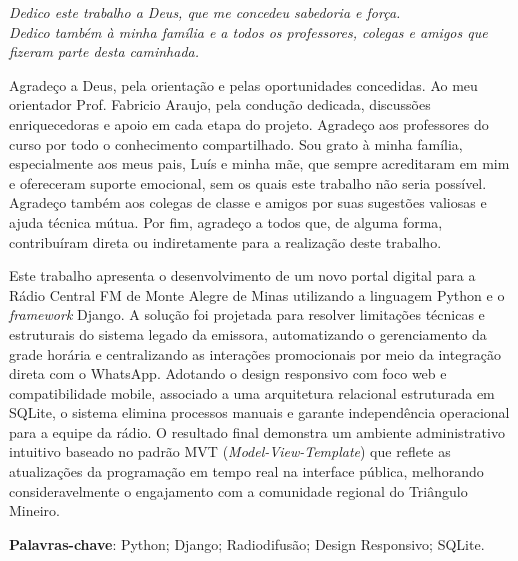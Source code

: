 \documentclass[12pt, openright, oneside, a4paper, brazil]{ads-unipac-abntex2}
\begin{document}
 
\frenchspacing 

\imprimircapa
\imprimirfolhaderosto

\begin{dedicatoria}
  \vspace*{\fill}
  \centering
  \noindent
  \textit{Dedico este trabalho a Deus, que me concedeu sabedoria e força. \\
  Dedico também à minha família e a todos os professores, colegas e amigos que fizeram parte desta caminhada.}
  \vspace*{\fill}
\end{dedicatoria}

\begin{agradecimentos}
\noindent
Agradeço a Deus, pela orientação e pelas oportunidades concedidas. Ao meu orientador Prof. Fabricio Araujo, pela condução dedicada, discussões enriquecedoras e apoio em cada etapa do projeto. Agradeço aos professores do curso por todo o conhecimento compartilhado. Sou grato à minha família, especialmente aos meus pais, Luís e minha mãe, que sempre acreditaram em mim e ofereceram suporte emocional, sem os quais este trabalho não seria possível. Agradeço também aos colegas de classe e amigos por suas sugestões valiosas e ajuda técnica mútua. Por fim, agradeço a todos que, de alguma forma, contribuíram direta ou indiretamente para a realização deste trabalho.
\end{agradecimentos}

\begin{resumo}
Este trabalho apresenta o desenvolvimento de um novo portal digital para a Rádio Central FM de Monte Alegre de Minas utilizando a linguagem Python e o \textit{framework} Django. A solução foi projetada para resolver limitações técnicas e estruturais do sistema legado da emissora, automatizando o gerenciamento da grade horária e centralizando as interações promocionais por meio da integração direta com o WhatsApp. Adotando o design responsivo com foco web e compatibilidade mobile, associado a uma arquitetura relacional estruturada em SQLite, o sistema elimina processos manuais e garante independência operacional para a equipe da rádio. O resultado final demonstra um ambiente administrativo intuitivo baseado no padrão MVT (\textit{Model-View-Template}) que reflete as atualizações da programação em tempo real na interface pública, melhorando consideravelmente o engajamento com a comunidade regional do Triângulo Mineiro.

\vspace{\onelineskip}
    
 \noindent
 \textbf{Palavras-chave}: Python; Django; Radiodifusão; Design Responsivo; SQLite.
\end{resumo}
\end{document}
